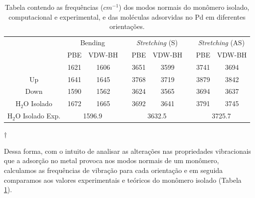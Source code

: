 \begin{table}[b!]
 	\centering
 	\caption{Tabela contendo as frequências ($ \si{cm}^{-1} $) dos modos normais do monômero isolado, computacional e experimental, e das moléculas adsorvidas no Pd em diferentes orientações. \label{tab:modos}}
 	\begin{threeparttable}
 		\begin{tabular}{ccccccccc} 
 			\hline\hline\addlinespace[3.6pt]
 			\multicolumn{9}{c}{\textbf{Frequências dos Modos Normais (\si{\cm}$ ^{-1} $) - Monômero}}                                                                                                                            \\ 
 			\midrule
 			\multirow{3}{*}{}              & \multicolumn{2}{c}{Bending}              &  & \multicolumn{2}{c}{\textit{Stretching} (S)}                &  & \multicolumn{2}{c}{\textit{Stretching} (AS)}               \\ 
 			\cmidrule{2-3}\cmidrule{5-6}\cmidrule{8-9}&PBE & VDW-BH &  & PBE &VDW-BH&  & PBE &VDW-BH \\ 
 			\midrule Flat   & 1621& 1606             &  & 3651              &3599             &  &3741            & 3694              \\ 
 			Up & 1641& 1645  &  & 3768              & 3719              &  & 3879              & 3842               \\		
 			Down & 1590             &
 			1562           &  & 3624              & 3565   &  & 3694              & 3637               \\				 H$ _2$O Isolado  & 1672             &1665
 			&  & 3692             &  3641  &  & 3791             &   3745           \\ \midrule
 			H$ _2 $O Isolado Exp.\tnote{$\dagger$} & \multicolumn{2}{c}{1596.9}                         &  & \multicolumn{2}{c}{3632.5}                   &  & \multicolumn{2}{c}{3725.7}                       \\ \hline\hline
 		\end{tabular}
 		\begin{tablenotes}\footnotesize
 			\item[$\dagger$] \citeauthor{ref-modos}
 		\end{tablenotes}
 	\end{threeparttable}
 \end{table}
 
 Dessa forma, com o intuito de analisar as alterações nas propriedades vibracionais que a adsorção no metal provoca nos modos normais de um monômero, calculamos as frequências de vibração para cada orientação e em seguida comparamos aos valores experimentais e teóricos do monômero isolado (Tabela \ref{tab:modos}).
 
